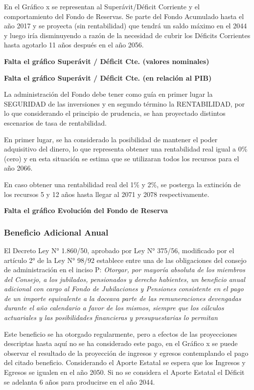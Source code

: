 \documentclass[a4paper,11pt]{article}
\begin{document}
En el Gráfico x se representan al Superávit/Déficit Corriente y el comportamiento del Fondo de Reservas.  Se parte del Fondo Acumulado hasta el año 2017 y se proyecta (sin rentabilidad) que tendrá un saldo máximo en el 2044 y luego iría disminuyendo a razón de la necesidad de cubrir los Déficits Corrientes hasta agotarlo 11 años después en el año 2056.

\textbf{Falta el gráfico Superávit / Déficit Cte. (valores nominales)}

\textbf{Falta el gráfico Superávit / Déficit Cte. (en relación al PIB)}

La administración del Fondo debe tener como guía en primer lugar la SEGURIDAD de las inversiones y en segundo término la RENTABILIDAD, por lo que considerando el principio de prudencia, se han proyectado distintos escenarios de tasa de rentabilidad.

En primer lugar, se ha considerado la posibilidad de mantener el poder adquisitivo del dinero, lo que representa obtener una rentabilidad real igual a 0\% (cero) y en esta situación se estima que se utilizaran todos los recursos para el año 2066.

En caso obtener una rentabilidad real del 1\% y 2\%, se posterga la extinción de los recursos 5 y 12 años hasta llegar al 2071 y 2078 respectivamente.

\textbf{Falta el gráfico Evolución del Fondo de Reserva}

\subsubsection{Beneficio Adicional Anual}

El Decreto Ley N° 1.860/50, aprobado por Ley N° 375/56, modificado por el artículo 2° de la Ley N° 98/92 establece entre una de las obligaciones del consejo de administración en el inciso P:
\textit{Otorgar, por mayoría absoluta de los miembros del Consejo, a los jubilados, pensionados y derecho habientes, un beneficio anual adicional con cargo al Fondo de Jubilaciones y Pensiones consistente en el pago de un importe equivalente a la doceava parte de las remuneraciones devengadas durante el año calendario a favor de los mismos, siempre que los cálculos actuariales y las posibilidades financieras y presupuestarias lo permitan}

Este beneficio se ha otorgado regularmente, pero a efectos de las proyecciones descriptas hasta aquí no se ha considerado este pago, en el Gráfico x se puede observar el resultado de la proyección de ingresos y egresos contemplando el pago del citado beneficio. Considerando el Aporte Estatal se espera que los Ingresos y Egresos se igualen en el año 2050.  Si no se considera el Aporte Estatal el Déficit se adelanta 6 años para producirse en el año 2044.
\end{document}
